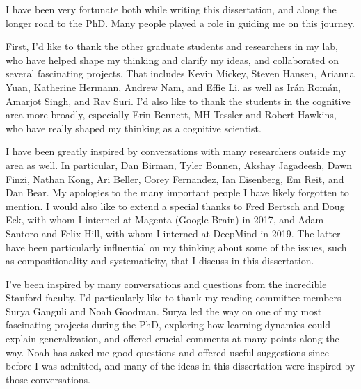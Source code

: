 \documentclass{report}
\begin{document}

I have been very fortunate both while writing this dissertation, and along the longer road to the PhD. Many people played a role in guiding me on this journey.

First, I'd like to thank the other graduate students and researchers in my lab, who have helped shape my thinking and clarify my ideas, and collaborated on several fascinating projects. That includes Kevin Mickey, Steven Hansen, Arianna Yuan, Katherine Hermann, Andrew Nam, and Effie Li, as well as Ir\'an Rom\'an, Amarjot Singh, and Rav Suri. I'd also like to thank the students in the cognitive area more broadly, especially Erin Bennett, MH Tessler and Robert Hawkins, who have really shaped my thinking as a cognitive scientist. 

I have been greatly inspired by conversations with many researchers outside my area as well. In particular, Dan Birman, Tyler Bonnen, Akshay Jagadeesh, Dawn Finzi, Nathan Kong, Ari Beller, Corey Fernandez, Ian Eisenberg, Em Reit, and Dan Bear. My apologies to the many important people I have likely forgotten to mention. I would also like to extend a special thanks to Fred Bertsch and Doug Eck, with whom I interned at Magenta (Google Brain) in 2017, and Adam Santoro and Felix Hill, with whom I interned at DeepMind in 2019. The latter have been particularly influential on my thinking about some of the issues, such as compositionality and systematicity, that I discuss in this dissertation. 


I've been inspired by many conversations and questions from the incredible Stanford faculty. I'd particularly like to thank my reading committee members Surya Ganguli and Noah Goodman. Surya led the way on one of my most fascinating projects during the PhD, exploring how learning dynamics could explain generalization, and offered crucial comments at many points along the way. Noah has asked me good questions and offered useful suggestions since before I was admitted, and many of the ideas in this dissertation were inspired by those conversations. 
\end{document}
